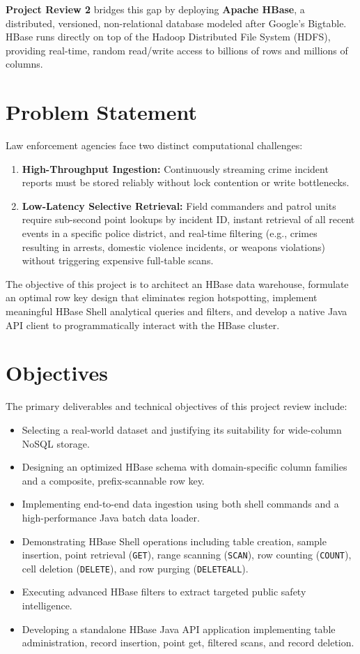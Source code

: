 \documentclass[12pt, a4paper]{article}
\begin{document}
\textbf{Project Review 2} bridges this gap by deploying \textbf{Apache HBase}, a distributed, versioned, non-relational database modeled after Google's Bigtable. HBase runs directly on top of the Hadoop Distributed File System (HDFS), providing real-time, random read/write access to billions of rows and millions of columns.

\section{Problem Statement}
Law enforcement agencies face two distinct computational challenges:
\begin{enumerate}
    \item \textbf{High-Throughput Ingestion:} Continuously streaming crime incident reports must be stored reliably without lock contention or write bottlenecks.
    \item \textbf{Low-Latency Selective Retrieval:} Field commanders and patrol units require sub-second point lookups by incident ID, instant retrieval of all recent events in a specific police district, and real-time filtering (e.g., crimes resulting in arrests, domestic violence incidents, or weapons violations) without triggering expensive full-table scans.
\end{enumerate}
The objective of this project is to architect an HBase data warehouse, formulate an optimal row key design that eliminates region hotspotting, implement meaningful HBase Shell analytical queries and filters, and develop a native Java API client to programmatically interact with the HBase cluster.

\section{Objectives}
The primary deliverables and technical objectives of this project review include:
\begin{itemize}
    \item Selecting a real-world dataset and justifying its suitability for wide-column NoSQL storage.
    \item Designing an optimized HBase schema with domain-specific column families and a composite, prefix-scannable row key.
    \item Implementing end-to-end data ingestion using both shell commands and a high-performance Java batch data loader.
    \item Demonstrating HBase Shell operations including table creation, sample insertion, point retrieval (\texttt{GET}), range scanning (\texttt{SCAN}), row counting (\texttt{COUNT}), cell deletion (\texttt{DELETE}), and row purging (\texttt{DELETEALL}).
    \item Executing advanced HBase filters to extract targeted public safety intelligence.
    \item Developing a standalone HBase Java API application implementing table administration, record insertion, point get, filtered scans, and record deletion.
\end{itemize}
\end{document}
